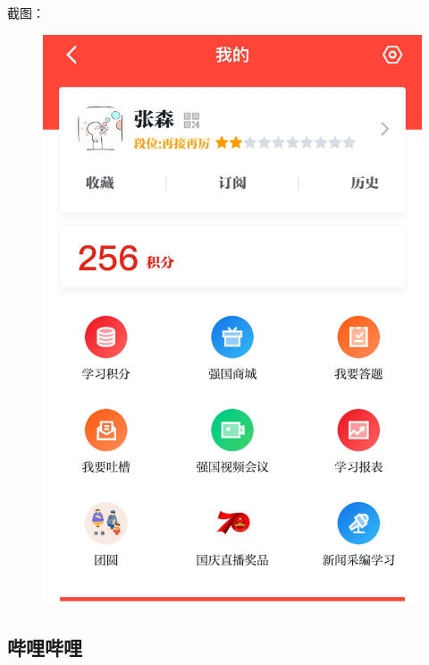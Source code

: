 \documentclass{article}
\begin{document}
截图：
\begin{figure}[H]
    \centering
    \includegraphics[scale=0.28]{F3}
    \label{fig:F3}
\end{figure}

\subsection{哔哩哔哩}
\end{document}
